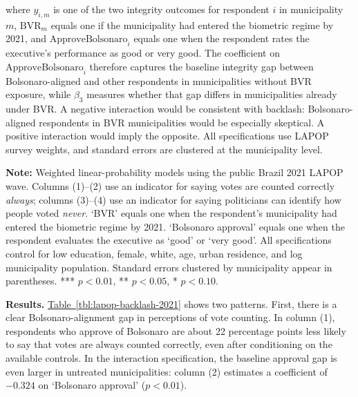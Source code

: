 where $y_{i,m}$ is one of the two integrity outcomes for respondent $i$ in municipality $m$, $\text{BVR}_m$ equals one if the municipality had entered the biometric regime by 2021, and $\text{ApproveBolsonaro}_i$ equals one when the respondent rates the executive's performance as good or very good. The coefficient on $\text{ApproveBolsonaro}_i$ therefore captures the baseline integrity gap between Bolsonaro-aligned and other respondents in municipalities without BVR exposure, while $\beta_3$ measures whether that gap differs in municipalities already under BVR. A negative interaction would be consistent with backlash: Bolsonaro-aligned respondents in BVR municipalities would be especially skeptical. A positive interaction would imply the opposite. All specifications use LAPOP survey weights, and standard errors are clustered at the municipality level.

\begin{table}[ht]
    \caption{Backlash and electoral-integrity regressions, LAPOP Brazil 2021}
    \label{tbl:lapop-backlash-2021}
    
    \begin{minipage}{\textwidth}
        {\footnotesize \textbf{Note:} Weighted linear-probability models using the public Brazil 2021 LAPOP wave. Columns (1)--(2) use an indicator for saying votes are counted correctly \emph{always}; columns (3)--(4) use an indicator for saying politicians can identify how people voted \emph{never}. `BVR' equals one when the respondent's municipality had entered the biometric regime by 2021. `Bolsonaro approval' equals one when the respondent evaluates the executive as `good' or `very good'. All specifications control for low education, female, white, age, urban residence, and log municipality population. Standard errors clustered by municipality appear in parentheses. *** $p<0.01$, ** $p<0.05$, * $p<0.10$. \par}
    \end{minipage}
\end{table}

\textbf{Results.} \hyperref[tbl:lapop-backlash-2021]{Table~\ref*{tbl:lapop-backlash-2021}} shows two patterns. First, there is a clear Bolsonaro-alignment gap in perceptions of vote counting. In column (1), respondents who approve of Bolsonaro are about 22 percentage points less likely to say that votes are always counted correctly, even after conditioning on the available controls. In the interaction specification, the baseline approval gap is even larger in untreated municipalities: column (2) estimates a coefficient of $-0.324$ on `Bolsonaro approval' ($p<0.01$).

